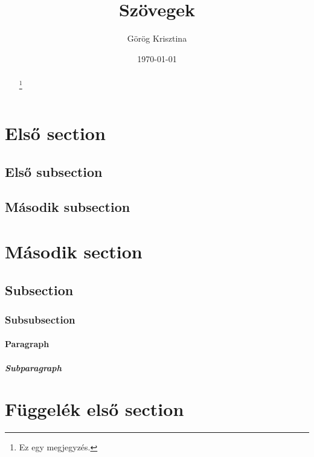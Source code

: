 \documentclass[12pt, twoside]{article}
\title{Szövegek}
\author{Görög Krisztina}
\date{\today}
\begin{document}
\pagestyle{fancy}
\setlength{\headheight}{52pt}

\renewcommand{\footrulewidth}{0.4pt}
\fancyhead[LE,RO]{\thepage}
\fancyhead[LO]{\leftmark}
\fancyhead[RE]{\rightmark}

\renewcommand{\thefootnote}{\fnsymbol{footnote}}
\maketitle

\begin{abstract}
\hulipsum[1]\footnote{Ez egy megjegyzés.}
\end{abstract}

\setcounter{tocdepth}{5}
\tableofcontents
\clearpage

\setcounter{secnumdepth}{5}

\section{Első section}
\subsection{Első subsection}
\hulipsum

\subsection{Második subsection}
\hulipsum

\section[Második]{Második section}
\subsection{Subsection}
\subsubsection{Subsubsection}
\paragraph{Paragraph}
\subparagraph{Subparagraph}

\appendix
\section{Függelék első section}
\end{document}
